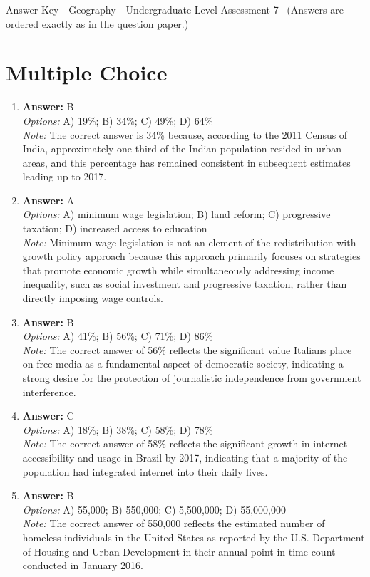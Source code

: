 \documentclass[12pt]{article}
\begin{document}
\begin{center}
Answer Key - Geography - Undergraduate Level Assessment 7 \
\small (Answers are ordered exactly as in the question paper.)
\end{center}

\section*{Multiple Choice}
\begin{enumerate}[label=\arabic*.]
\item \textbf{Answer:} B
\\ \textit{Options:} A) 19\%; B) 34\%; C) 49\%; D) 64\%
\\ \textit{Note:} The correct answer is 34\% because, according to the 2011 Census of India, approximately one-third of the Indian population resided in urban areas, and this percentage has remained consistent in subsequent estimates leading up to 2017.
\item \textbf{Answer:} A
\\ \textit{Options:} A) minimum wage legislation; B) land reform; C) progressive taxation; D) increased access to education
\\ \textit{Note:} Minimum wage legislation is not an element of the redistribution-with-growth policy approach because this approach primarily focuses on strategies that promote economic growth while simultaneously addressing income inequality, such as social investment and progressive taxation, rather than directly imposing wage controls.
\item \textbf{Answer:} B
\\ \textit{Options:} A) 41\%; B) 56\%; C) 71\%; D) 86\%
\\ \textit{Note:} The correct answer of 56\% reflects the significant value Italians place on free media as a fundamental aspect of democratic society, indicating a strong desire for the protection of journalistic independence from government interference.
\item \textbf{Answer:} C
\\ \textit{Options:} A) 18\%; B) 38\%; C) 58\%; D) 78\%
\\ \textit{Note:} The correct answer of 58\% reflects the significant growth in internet accessibility and usage in Brazil by 2017, indicating that a majority of the population had integrated internet into their daily lives.
\item \textbf{Answer:} B
\\ \textit{Options:} A) 55,000; B) 550,000; C) 5,500,000; D) 55,000,000
\\ \textit{Note:} The correct answer of 550,000 reflects the estimated number of homeless individuals in the United States as reported by the U.S. Department of Housing and Urban Development in their annual point-in-time count conducted in January 2016.
\end{enumerate}
\end{document}
